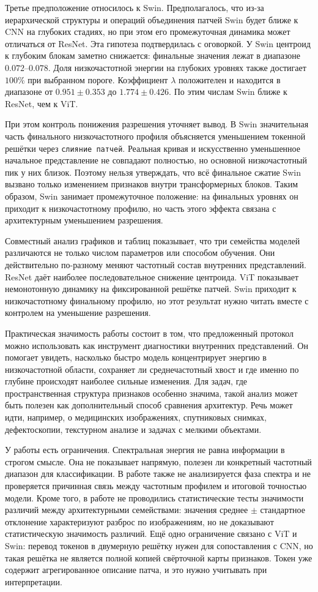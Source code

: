 Третье предположение относилось к Swin. Предполагалось, что из-за иерархической структуры и операций объединения патчей Swin будет ближе к CNN на глубоких стадиях, но при этом его промежуточная динамика может отличаться от ResNet. Эта гипотеза подтвердилась с оговоркой. У Swin центроид к глубоким блокам заметно снижается: финальные значения лежат в диапазоне $0.072$--$0.078$. Доля низкочастотной энергии на глубоких уровнях также достигает $100\%$ при выбранном пороге. Коэффициент $\lambda$ положителен и находится в диапазоне от $0.951 \pm 0.353$ до $1.774 \pm 0.426$. По этим числам Swin ближе к ResNet, чем к ViT.

При этом контроль понижения разрешения уточняет вывод. В Swin значительная часть финального низкочастотного профиля объясняется уменьшением токенной решётки через \texttt{слияние патчей}. Реальная кривая и искусственно уменьшенное начальное представление не совпадают полностью, но основной низкочастотный пик у них близок. Поэтому нельзя утверждать, что всё финальное сжатие Swin вызвано только изменением признаков внутри трансформерных блоков. Таким образом, Swin занимает промежуточное положение: на финальных уровнях он приходит к низкочастотному профилю, но часть этого эффекта связана с архитектурным уменьшением разрешения.

Совместный анализ графиков и таблиц показывает, что три семейства моделей различаются не только числом параметров или способом обучения. Они действительно по-разному меняют частотный состав внутренних представлений. ResNet даёт наиболее последовательное снижение центроида. ViT показывает немонотонную динамику на фиксированной решётке патчей. Swin приходит к низкочастотному финальному профилю, но этот результат нужно читать вместе с контролем на уменьшение разрешения.

Практическая значимость работы состоит в том, что предложенный протокол можно использовать как инструмент диагностики внутренних представлений. Он помогает увидеть, насколько быстро модель концентрирует энергию в низкочастотной области, сохраняет ли среднечастотный хвост и где именно по глубине происходят наиболее сильные изменения. Для задач, где пространственная структура признаков особенно значима, такой анализ может быть полезен как дополнительный способ сравнения архитектур. Речь может идти, например, о медицинских изображениях, спутниковых снимках, дефектоскопии, текстурном анализе и задачах с мелкими объектами.

У работы есть ограничения. Спектральная энергия не равна информации в строгом смысле. Она не показывает напрямую, полезен ли конкретный частотный диапазон для классификации. В работе также не анализируется фаза спектра и не проверяется причинная связь между частотным профилем и итоговой точностью модели. Кроме того, в работе не проводились статистические тесты значимости различий между архитектурными семействами: значения среднее $\pm$ стандартное отклонение характеризуют разброс по изображениям, но не доказывают статистическую значимость различий. Ещё одно ограничение связано с ViT и Swin: перевод токенов в двумерную решётку нужен для сопоставления с CNN, но такая решётка не является полной копией свёрточной карты признаков. Токен уже содержит агрегированное описание патча, и это нужно учитывать при интерпретации.

